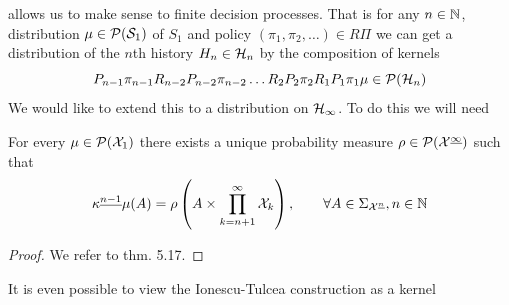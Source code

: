  allows us to make sense to finite decision processes.
That is for any
$n \in \mathbb{N}$, distribution $\mu \in \mathcal{P}(\mathcal{S}_1)$ of $S_1$ 
and policy $(\pi_1, \pi_2, \dots) \in R\Pi$ we can get a distribution
of the $n$th history $H_n \in \mathcal{H}_n$ by the composition of kernels
\[ P_{n-1} \pi_{n-1} R_{n-2} P_{n-2} \pi_{n-2}
\dots R_2 P_2 \pi_2 R_1 P_1 \pi_1 \mu \in \mathcal{P}(\mathcal{H}_n) \]
We would like to extend this to a distribution on $\mathcal{H}_\infty$.
To do this we will need

\begin{thm}
  For every $\mu \in \mathcal{P}(\mathcal{X}_1)$ 
  there exists a unique probability measure
  $\rho \in \mathcal{P}(\mathcal{X}^{\underline{\infty}})$ such that
  \[ \kappa^{\underline{n-1}} \mu (A) = \rho
    \left( A \times \prod_{k=n+1}^\infty \mathcal{X}_k \right)
  , \qquad \forall A \in \Sigma_{\mathcal{X}^{\underline{n}}}, n \in \mathbb{N} \]
  \label{thm:ionescuTulcea}
\end{thm}
\begin{proof}
  We refer to  thm. 5.17. %
\end{proof}

It is even possible to view the Ionescu-Tulcea construction as a kernel

